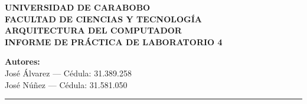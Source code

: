 \documentclass[12pt,a4paper]{article}
\begin{document}
\begin{center}
    {\large \textbf{UNIVERSIDAD DE CARABOBO}} \\[0.2cm]
    {\large \textbf{FACULTAD DE CIENCIAS Y TECNOLOGÍA}} \\[0.2cm]
    {\normalsize \textbf{ARQUITECTURA DEL COMPUTADOR}} \\[0.5cm]
    {\Large \textbf{INFORME DE PRÁCTICA DE LABORATORIO 4}} \\[0.8cm]
\end{center}

\noindent
\textbf{Autores:} \\
José Álvarez --- Cédula: 31.389.258 \\
José Núñez --- Cédula: 31.581.050 \\
\vspace{0.5cm}

\hrule
\vspace{0.5cm}
\end{document}
